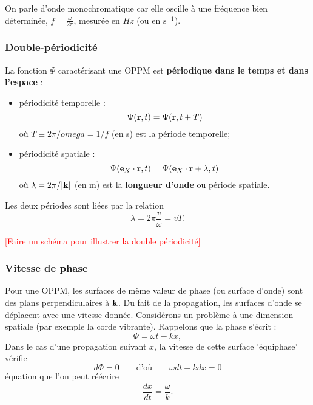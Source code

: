 \documentclass[11pt,a4paper]{report}
\begin{document}
On parle d'onde monochromatique car elle oscille à une fréquence bien déterminée, $f = \frac{\omega}{2\pi}$, mesurée en $Hz$ (ou en $\text{s}^{-1}$).\\

\subsubsection{Double-périodicité}

La fonction $\Psi$ caractérisant une OPPM est \textbf{périodique dans le temps et dans l'espace} :
\begin{itemize}
	\item périodicité temporelle :
	\begin{equation}
		\Psi(\bold{r},t) = \Psi(\bold{r},t+T)
	\end{equation}	 
	où $T \equiv 2\pi /omega = 1/f$ (en s) est la période temporelle;
	\item périodicité spatiale :
	\begin{equation}
		\Psi(\bold{e}_X\cdot\bold{r},t) = \Psi(\bold{e}_X\cdot\bold{r} + \lambda,t)
	\end{equation}
	où $\lambda = 2\pi/|\bold{k}|$ (en m) est la \textbf{longueur d'onde} ou période spatiale.
\end{itemize}

Les deux périodes sont liées par la relation
\begin{equation}
	\lambda = 2\pi\frac{v}{\omega} = v T. 
\end{equation}

\textcolor{red}{[Faire un schéma pour illustrer la double périodicité]}

\subsubsection{Vitesse de phase}

Pour une OPPM, les surfaces de même valeur de phase (ou surface d'onde) sont des plans perpendiculaires à $\bold{k}$. Du fait de la propagation, les surfaces d'onde se déplacent avec une vitesse donnée. Considérons un problème à une dimension spatiale (par exemple la corde vibrante). Rappelons que la phase s'écrit :
\begin{equation}
	\Phi = \omega t - k x,
\end{equation}
Dans le cas d'une propagation suivant $x$, la vitesse de cette surface 'équiphase' vérifie
\begin{equation}
	d\Phi = 0 \qquad\text{d'où}\qquad \omega dt - k dx = 0
\end{equation}
équation que l'on peut réécrire
\begin{equation}
	\frac{dx}{dt} = \frac{\omega}{k}.
\end{equation}
\end{document}
